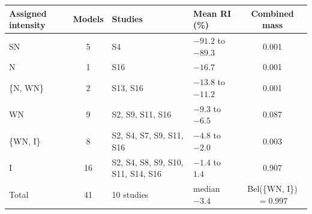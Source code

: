 \begin{tabular}{@{}lcl>{\centering\arraybackslash}p{2.6cm}c@{}}
\toprule
\textbf{Assigned intensity} & \textbf{Models} & \textbf{Studies} & \textbf{Mean RI (\%)} & \textbf{Combined mass} \\
\midrule
SN & 5 & S4 & $-91.2$ to $-89.3$ & 0.001 \\
N & 1 & S16 & $-16.7$ & 0.001 \\
\{N, WN\} & 2 & S13, S16 & $-13.8$ to $-11.2$ & 0.001 \\
WN & 9 & S2, S9, S11, S16 & $-9.3$ to $-6.5$ & 0.087 \\
\{WN, I\} & 8 & S2, S4, S7, S9, S11, S16 & $-4.8$ to $-2.0$ & 0.003 \\
I & 16 & S2, S4, S8, S9, S10, S11, S14, S16 & $-1.4$ to $1.4$ & 0.907 \\
\midrule
Total & 41 & 10 studies & median $-3.4$ & Bel(\{WN, I\}) $= 0.997$ \\
\bottomrule
\end{tabular}
